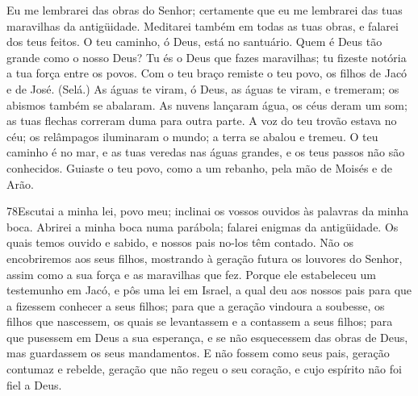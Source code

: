 Eu me lembrarei das obras do Senhor; certamente que eu me
lembrarei das tuas maravilhas da antigüidade. Meditarei
também em todas as tuas obras, e falarei dos teus feitos. O
teu caminho, ó Deus, está no santuário. Quem é Deus tão grande como
o nosso Deus? Tu és o Deus que fazes maravilhas; tu fizeste
notória a tua força entre os povos. Com o teu braço remiste o
teu povo, os filhos de Jacó e de José. (Selá.) As águas te
viram, ó Deus, as águas te viram, e tremeram; os abismos também se
abalaram. As nuvens lançaram água, os céus deram um som; as
tuas flechas correram duma para outra parte. A voz do teu
trovão estava no céu; os relâmpagos iluminaram o mundo; a terra se
abalou e tremeu. O teu caminho é no mar, e as tuas veredas
nas águas grandes, e os teus passos não são conhecidos.
Guiaste o teu povo, como a um rebanho, pela mão de Moisés e
de Arão.

\bigskip

\lettrine{78}{}Escutai a minha lei, povo meu; inclinai os
vossos ouvidos às palavras da minha boca. Abrirei a minha boca
numa parábola; falarei enigmas da antigüidade. Os quais temos
ouvido e sabido, e nossos pais no-los têm contado. Não os
encobriremos aos seus filhos, mostrando à geração futura os louvores
do Senhor, assim como a sua força e as maravilhas que fez.
Porque ele estabeleceu um testemunho em Jacó, e pôs uma lei em
Israel, a qual deu aos nossos pais para que a fizessem conhecer a
seus filhos; para que a geração vindoura a soubesse, os filhos
que nascessem, os quais se levantassem e a contassem a seus filhos;
para que pusessem em Deus a sua esperança, e se não esquecessem
das obras de Deus, mas guardassem os seus mandamentos. E não
fossem como seus pais, geração contumaz e rebelde, geração que não
regeu o seu coração, e cujo espírito não foi fiel a Deus.

